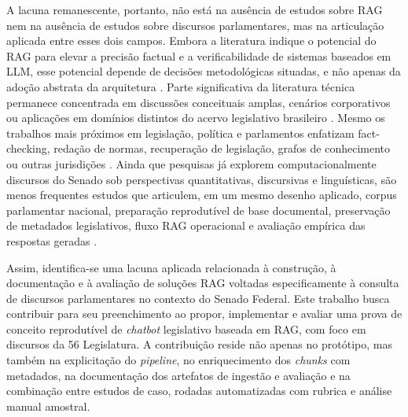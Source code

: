 A lacuna remanescente, portanto, não está na ausência de estudos sobre RAG nem na ausência de estudos sobre discursos parlamentares, mas na articulação aplicada entre esses dois campos. Embora a literatura indique o potencial do RAG para elevar a precisão factual e a verificabilidade de sistemas baseados em LLM, esse potencial depende de decisões metodológicas situadas, e não apenas da adoção abstrata da arquitetura \parencite{gao2023ragSurvey,gupta2024comprehensiveRag,saadFalconEtAl2024ares}. Parte significativa da literatura técnica permanece concentrada em discussões conceituais amplas, cenários corporativos ou aplicações em domínios distintos do acervo legislativo brasileiro \parencite{gao2023ragSurvey,gupta2024comprehensiveRag}. Mesmo os trabalhos mais próximos em legislação, política e parlamentos enfatizam fact-checking, redação de normas, recuperação de legislação, grafos de conhecimento ou outras jurisdições \parencite{khaliq2024ragar,chouhanGertz2024lexdrafter,rogiersEtAl2024kamerraad,matoshiEtAl2025parliamentRag,garrisonEtAl2024talkNdaa,colomboEtAl2025legisSearch,mosbachEtAl2025worldAvatarParliament,sarnikar2025legislativeTexts}. Ainda que pesquisas já explorem computacionalmente discursos do Senado sob perspectivas quantitativas, discursivas e linguísticas, são menos frequentes estudos que articulem, em um mesmo desenho aplicado, corpus parlamentar nacional, preparação reprodutível de base documental, preservação de metadados legislativos, fluxo RAG operacional e avaliação empírica das respostas geradas \parencite{blanco2025plenarioPalanqueEstudio,blanco2026letrasGraudas,martelloteViola2025organizacaoConhecimento}.

Assim, identifica-se uma lacuna aplicada relacionada à construção, à documentação e à avaliação de soluções RAG voltadas especificamente à consulta de discursos parlamentares no contexto do Senado Federal. Este trabalho busca contribuir para seu preenchimento ao propor, implementar e avaliar uma prova de conceito reprodutível de \textit{chatbot} legislativo baseada em RAG, com foco em discursos da 56\textordfeminine{} Legislatura. A contribuição reside não apenas no protótipo, mas também na explicitação do \textit{pipeline}, no enriquecimento dos \textit{chunks} com metadados, na documentação dos artefatos de ingestão e avaliação e na combinação entre estudos de caso, rodadas automatizadas com rubrica e análise manual amostral.
